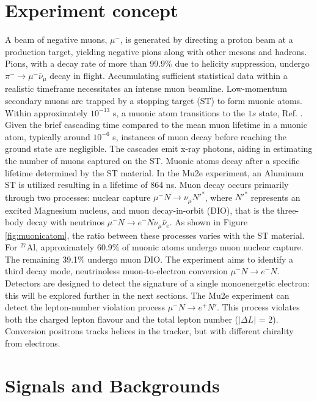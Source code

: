 \section{Experiment concept}
A beam of negative muons, $\mu ^-$, is generated by directing a proton beam at a 
production target, yielding negative pions along with other mesons and hadrons. 
Pions, with a decay rate of more than 99.9\% due to helicity suppression, undergo 
$\pi ^- \rightarrow \mu ^- \bar{\nu}_\mu$ decay in flight. 
Accumulating sufficient statistical data within a realistic timeframe necessitates 
an intense muon beamline. 
Low-momentum secondary muons are trapped by a stopping target (ST) to form muonic atoms. 
Within approximately $10^{-13}$ s, 
a muonic atom transitions to the $1s$ state, Ref. \cite{MEASDAY2001243}. 
Given the brief cascading time compared to the mean muon lifetime in a muonic atom, 
typically around $10^{-6}$ s, 
instances of muon decay before reaching the ground state are negligible. 
The cascades emit x-ray photons, aiding in estimating the number of muons captured 
on the ST. 
Muonic atoms decay after a specific lifetime determined by the ST material. 
In the Mu2e experiment, an Aluminum ST is utilized resulting in a lifetime of 
864 ns. Muon decay occurs primarily through two processes: 
nuclear capture $\mu^- N \rightarrow \nu_\mu N'^* $, where $N'^*$ represents an excited 
Magnesium nucleus, and muon decay-in-orbit (DIO), 
that is the three-body decay with neutrinos $\mu ^- N \rightarrow e^- N \nu_\mu \bar{\nu}_e$. 
As shown in Figure \ref{fig:muonicatom}, the ratio between these 
processes varies with the ST material. For $^{27}$Al, approximately 60.9\% 
of muonic atoms undergo muon nuclear capture. The remaining 39.1\% undergo muon DIO. 
The experiment aims to identify a third decay mode, neutrinoless muon-to-electron 
conversion $\mu^- N \rightarrow e^- N $. Detectors are designed to detect the signature of a 
single monoenergetic electron: this will be explored further in the next sections.
The Mu2e experiment can detect the lepton-number violation process 
$\mu^- N \rightarrow e^+ N'$.
This process violates both the charged lepton flavour and the total lepton 
number ($|\Delta L|$ = 2). 
Conversion positrons tracks helices in the tracker, but with different chirality from electrons. 
\section{Signals and Backgrounds}\label{sigandbkg}
